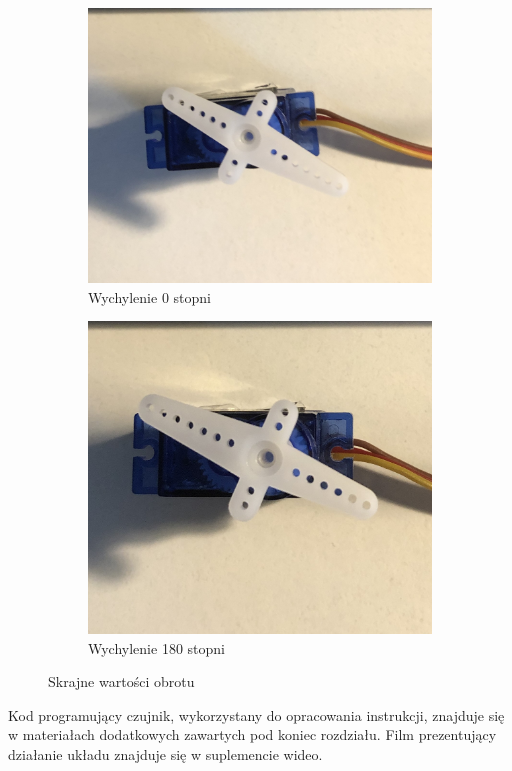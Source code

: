 \documentclass[11pt, a4paper]{article}
\begin{document}
\begin{figure}[h!]
\centering
\begin{subfigure}{.5\textwidth}
  \centering
  \includegraphics[width=0.9\linewidth]{fig/Serwo/zasada_dzialania/0.jpg}
  \caption{Wychylenie 0 stopni}
  \label{fig:sub1}
\end{subfigure}%
\begin{subfigure}{.5\textwidth}
  \centering
  \includegraphics[width=0.78\linewidth]{fig/Serwo/zasada_dzialania/180.jpg}
  \caption{Wychylenie 180 stopni}
  \label{fig:sub2}
\end{subfigure}
\caption{Skrajne wartości obrotu}
\label{fig:test}
\end{figure}
\newpage


Kod programujący czujnik, wykorzystany do opracowania instrukcji, znajduje się w materiałach dodatkowych zawartych pod koniec rozdziału.
\newline
Film prezentujący działanie układu znajduje się w suplemencie wideo.
\printbibliography[heading=bibintoc]
\end{document}
